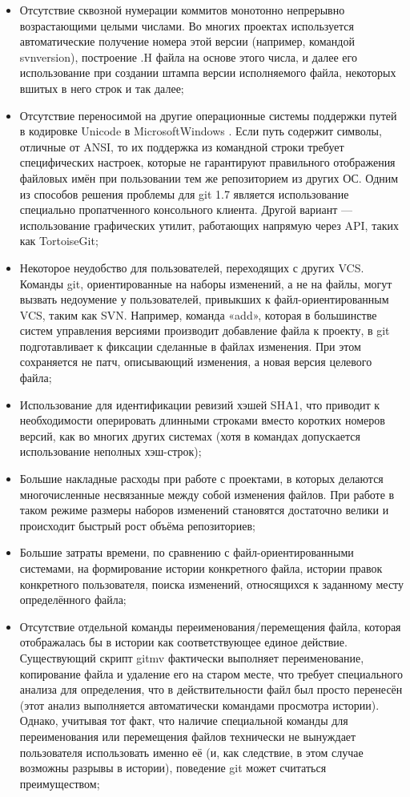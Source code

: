 \begin{itemize}
  \item Отсутствие сквозной нумерации коммитов монотонно непрерывно возрастающими целыми числами. Во многих проектах используется автоматические получение номера этой версии (например, командой svnversion), построение .H файла на основе этого числа, и далее его использование при создании штампа версии исполняемого файла, некоторых вшитых в него строк и так далее;
  \item Отсутствие переносимой на другие операционные системы поддержки путей в кодировке Unicode в MicrosoftWindows . Если путь содержит символы, отличные от ANSI, то их поддержка из командной строки требует специфических настроек, которые не гарантируют правильного отображения файловых имён при пользовании тем же репозиторием из других ОС. Одним из способов решения проблемы для git 1.7 является использование специально пропатченного консольного клиента. Другой вариант — использование графических утилит, работающих напрямую через API, таких как TortoiseGit;
  \item Некоторое неудобство для пользователей, переходящих с других VCS. Команды git, ориентированные на наборы изменений, а не на файлы, могут вызвать недоумение у пользователей, привыкших к файл-ориентированным VCS, таким как SVN. Например, команда «add», которая в большинстве систем управления версиями производит добавление файла к проекту, в git подготавливает к фиксации сделанные в файлах изменения. При этом сохраняется не патч, описывающий изменения, а новая версия целевого файла;
  \item Использование для идентификации ревизий хэшей SHA1, что приводит к необходимости оперировать длинными строками вместо коротких номеров версий, как во многих других системах (хотя в командах допускается использование неполных хэш-строк);
  \item Большие накладные расходы при работе с проектами, в которых делаются многочисленные несвязанные между собой изменения файлов. При работе в таком режиме размеры наборов изменений становятся достаточно велики и происходит быстрый рост объёма репозиториев;
  \item Большие затраты времени, по сравнению с файл-ориентированными системами, на формирование истории конкретного файла, истории правок конкретного пользователя, поиска изменений, относящихся к заданному месту определённого файла;
  \item Отсутствие отдельной команды переименования/перемещения файла, которая отображалась бы в истории как соответствующее единое действие. Существующий скрипт gitmv фактически выполняет переименование, копирование файла и удаление его на старом месте, что требует специального анализа для определения, что в действительности файл был просто перенесён (этот анализ выполняется автоматически командами просмотра истории). Однако, учитывая тот факт, что наличие специальной команды для переименования или перемещения файлов технически не вынуждает пользователя использовать именно её (и, как следствие, в этом случае возможны разрывы в истории), поведение git может считаться преимуществом;

\end{itemize}
